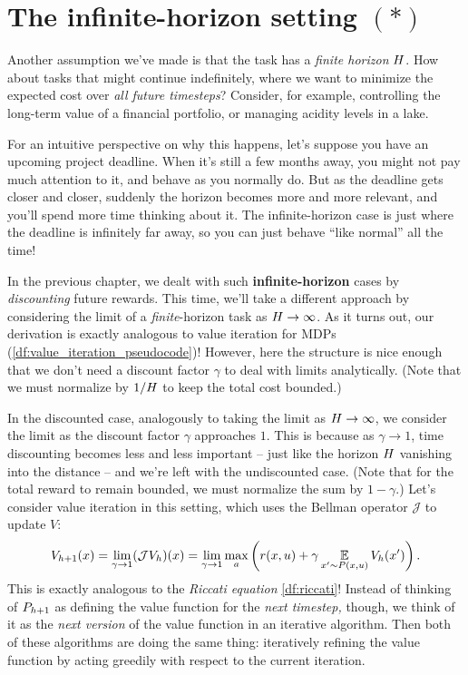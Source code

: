\documentclass[../main/main]{subfiles}
\begin{document}
\iffalse
\section{The infinite-horizon setting $(*)$}

Another assumption we've made is that the task has a \emph{finite horizon} $H$. How about tasks that might continue indefinitely, where we want to minimize the expected cost over \emph{all future timesteps}? Consider, for example, controlling the long-term value of a financial portfolio, or managing acidity levels in a lake.

For an intuitive perspective on why this happens, let's suppose you have an upcoming project deadline. When it's still a few months away, you might not pay
much attention to it, and behave as you normally do. But as the deadline gets closer and closer, suddenly the
horizon becomes more and more relevant, and you'll spend more time thinking about it.
The infinite-horizon case is just where the deadline is infinitely far away, so you can just behave ``like normal'' all the time!

In the previous chapter, we dealt with such \textbf{infinite-horizon} cases by \emph{discounting} future rewards. This time, we'll take a different approach by considering the limit of a \emph{finite}-horizon task as $H \to \infty$.
As it turns out, our derivation is exactly analogous to value iteration for MDPs (\autoref{df:value_iteration_pseudocode})!
However, here the structure is nice enough that we don't need a discount factor $\gamma$ to deal with limits analytically.
(Note that we must normalize by $1/H$ to keep the total cost bounded.)

In the discounted case, analogously to taking the limit as $H \to \infty$, we consider the limit as the discount factor $\gamma$ approaches $1$. This is because as $\gamma \to 1$, time discounting becomes less and less important -- just like the horizon $H$ vanishing into the distance -- and we're left with the undiscounted case. (Note that for the total reward to remain bounded, we must normalize the sum by $1 - \gamma$.) Let's consider value iteration in this setting, which uses the Bellman operator $\mathcal{J}$ to update $V$: \[
    V_{h+1}(x) = \lim_{\gamma \to 1} (\mathcal{J} V_h)(x) = \lim_{\gamma \to 1} \max_a \left( r(x, u) + \gamma \operatorname*{\mathbb{E}}_{x' \sim P(x, u)} V_h(x') \right).
\]
This is exactly analogous to the \emph{Riccati equation} \eqref{df:riccati}!
Instead of thinking of $P_{h+1}$ as defining the value function for the \emph{next timestep,} though, we think of it as the \emph{next version} of the value function in an iterative algorithm.
Then both of these algorithms are doing the same thing:
iteratively refining the value function by acting greedily with respect to the current iteration.
\end{document}
